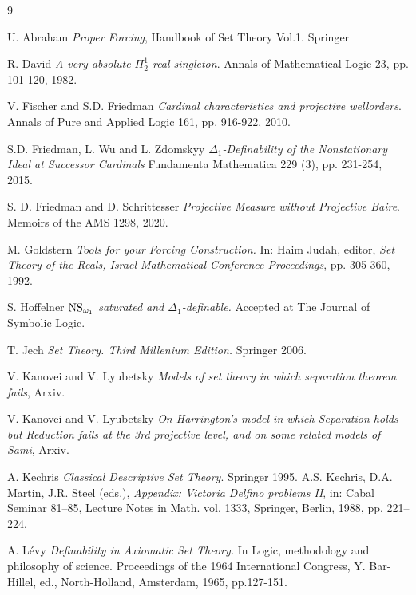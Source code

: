 \documentclass[a4paper,11pt]{article}
\begin{document}
\begin{thebibliography}{9}

U. Abraham \textit{ Proper Forcing}, Handbook of Set Theory Vol.1. Springer

R. David \textit{A very absolute $\Pi^1_2$-real singleton}. Annals of Mathematical Logic 23, pp. 101-120, 1982.

V. Fischer and S.D. Friedman 
\textit{Cardinal characteristics and projective wellorders}. 
Annals of Pure and Applied Logic 161, pp. 916-922, 2010.

 S.D. Friedman, L. Wu and L. Zdomskyy \textit{$\Delta_1$-Definability of the Nonstationary Ideal at Successor Cardinals} Fundamenta Mathematica 229 (3), pp. 231-254, 2015.

S. D. Friedman and D. Schrittesser \textit{Projective Measure without Projective Baire}. Memoirs of the AMS 1298, 2020.

 M. Goldstern \textit{Tools for your Forcing Construction.} In: Haim Judah, editor, \textit{Set Theory of the Reals, Israel Mathematical Conference Proceedings}, pp. 305-360, 1992.



 S. Hoffelner \textit{$\hbox{NS}_{\omega_1}$ saturated and $\Delta_1$-definable.} Accepted at The Journal of Symbolic Logic.

T. Jech \textit{Set Theory. Third Millenium Edition.} Springer 2006.

V. Kanovei and V. Lyubetsky \textit{Models of set theory in which separation theorem fails}, Arxiv.

V. Kanovei and V. Lyubetsky \textit{On Harrington’s model in which Separation holds but Reduction fails at the 3rd projective level, and on some related models of Sami}, Arxiv.
 
A. Kechris 
\textit{Classical Descriptive Set Theory}.  
Springer 1995.
A.S. Kechris, D.A. Martin, J.R. Steel (eds.), \textit{Appendix: Victoria Delfino problems II}, in: Cabal Seminar
81–85, Lecture Notes in Math. vol. 1333, Springer, Berlin, 1988, pp. 221–224.

A. L\'evy
\textit{Definability in Axiomatic Set Theory.} In Logic, methodology and philosophy of science. Proceedings of the 1964 International Congress, Y. Bar-Hillel, ed., North-Holland, Amsterdam, 1965, pp.127-151.


\end{thebibliography}
\end{document}

